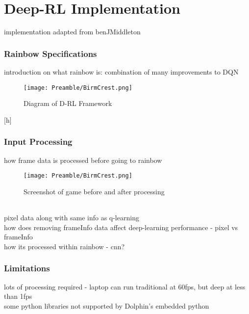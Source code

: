 
\chapter{Deep-RL Implementation}
implementation adapted from benJMiddleton
\cite{BenJMiddleton}
\subsection{Rainbow Specifications}
introduction on what rainbow is: combination of many improvements to DQN 
\cite{hessel2018rainbow}
\begin{figure}[h]
    \centering
    \texttt{[image: Preamble/BirmCrest.png]}
    \caption{Diagram of D-RL Framework}
    \label{fig:rainbow-arch}
\end{figure}[h]
\subsection{Input Processing}
how frame data is processed before going to rainbow
\begin{figure}
    \centering
    \texttt{[image: Preamble/BirmCrest.png]}
    \caption{Screenshot of game before and after processing}
    \label{fig:frame-processing}
\end{figure}
\\pixel data along with same info as q-learning
\\how does removing frameInfo data affect deep-learning performance - pixel vs frameInfo
\\how its processed within rainbow - cnn?
\subsection{Limitations}
lots of processing required - laptop can run traditional at 60fps, but deep at less than 1fps
\\ some python libraries not supported by Dolphin's embedded python